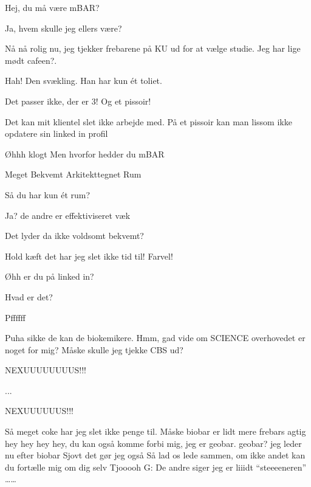 \documentclass[a4paper,11pt]{article}
\begin{document}
\begin{sketch}


Hej, du må være mBAR?

 Ja, hvem skulle jeg ellers være?

Nå nå rolig nu, jeg tjekker frebarene på KU ud for at vælge studie. Jeg har lige mødt cafeen?.

 Hah! Den svækling. Han har kun ét toliet.

 Det passer ikke, der er 3! Og et pissoir!

Det kan mit klientel slet ikke arbejde med. På et pissoir kan man lissom ikke opdatere sin linked in profil 

Øhhh klogt  Men hvorfor hedder du mBAR

Meget Bekvemt Arkitekttegnet Rum

Så du har kun ét rum?

Ja? de andre er effektiviseret væk

Det lyder da ikke voldsomt bekvemt?

Hold kæft det har jeg slet ikke tid til! Farvel!

Øhh er du på linked in?

Hvad er det?

Pffffff

Puha sikke de kan de biokemikere. Hmm, gad vide om SCIENCE overhovedet er noget for mig? Måske skulle jeg tjekke CBS ud?

NEXUUUUUUUUS!!!


...


NEXUUUUUUS!!!

Så meget coke har jeg slet ikke penge til. Måske biobar er lidt mere frebars agtig
hey hey hey hey, du kan også komme forbi mig, jeg er geobar. 
geobar? jeg leder nu efter biobar
Sjovt det gør jeg også 
Så lad os lede sammen, om ikke andet kan du fortælle mig om dig selv
Tjooooh
G: De andre siger jeg er liiidt “steeeeneren”
\ldots \ldots


\end{sketch}
\end{document}
